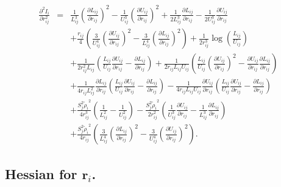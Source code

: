 \documentclass[12pt]{article}
\begin{document}
\begin{eqnarray}
\label{eq:BurialTerm2ndDerv2}
\frac{\partial^{2}I_{i}}{\partial r_{ij}^{2}} & = & 
\frac{1}{L_{ij}^{3}}\left(\frac{\partial L_{ij}}{\partial r_{ij}}\right)^{2} - \frac{1}{U_{ij}^{3}}\left(\frac{\partial U_{ij}}{\partial r_{ij}}\right)^{2}
+\frac{1}{2L_{ij}^{3}}\frac{\partial L_{ij}}{\partial r_{ij}} - \frac{1}{2U_{ij}^{3}}\frac{\partial U_{ij}}{\partial r_{ij}} \nonumber \\
&& + \frac{r_{ij}}{4}\left(\frac{3}{U_{ij}^{4}}\left(\frac{\partial U_{ij}}{\partial r_{ij}} \right)^{2}    - \frac{3}{L_{ij}^{4}}\left(\frac{\partial L_{ij}}{\partial r_{ij}} \right)^{2} \right) 
+ \frac{1}{2r_{ij}^{3}}\log\left(\frac{L_{ij}}{U_{ij}}\right) \nonumber \\
&& + \frac{1}{2r_{ij}^2L_{ij}}\left(  \frac{L_{ij}}{U_{ij}}\frac{\partial U_{ij}}{\partial r_{ij}} - \frac{\partial L_{ij}}{\partial r_{ij}} \right)
+ \frac{1}{2r_{ij}L_{ij}U_{ij}}\left(  \frac{L_{ij}}{U_{ij}}\left(\frac{\partial U_{ij}}{\partial r_{ij}}\right)^2-\frac{\partial U_{ij}}{\partial r_{ij}}  \frac{\partial L_{ij}}{\partial r_{ij}} \right) \nonumber \\
&& + \frac{1}{4r_{ij}L_{ij}^2}\frac{\partial L_{ij}}{\partial r_{ij}} \left(  \frac{L_{ij}}{U_{ij}}\frac{\partial U_{ij}}{\partial r_{ij}} - \frac{\partial L_{ij}}{\partial r_{ij}} \right)
- \frac{1}{4r_{ij}L_{ij}U_{ij}}\frac{\partial U_{ij}}{\partial r_{ij}} \left(  \frac{L_{ij}}{U_{ij}}\frac{\partial U_{ij}}{\partial r_{ij}} - \frac{\partial L_{ij}}{\partial r_{ij}} \right) \nonumber \\
&& + \frac{S_{j}^{2}{{\tilde{\rho}_{i}}}^{2}}{4r_{ij}^{3}}\left(\frac{1}{L_{ij}^2} - \frac{1}{U_{ij}^2} \right)
-\frac{S_{j}^{2}{{\tilde{\rho}_{i}}}^{2}}{2r_{ij}^{2}}\left( \frac{1}{U_{ij}^{3}}\frac{\partial U_{ij}}{\partial r_{ij}}
- \frac{1}{L_{ij}^{3}}\frac{\partial L_{ij}}{\partial r_{ij}}\right) \nonumber \\
&& + \frac{S_{j}^{2}{{\tilde{\rho}_{i}}}^{2}}{4r_{ij}}\left(\frac{3}{L_{ij}^{4}} \left(\frac{\partial L_{ij}}{\partial r_{ij}} \right)^{2} 
 - \frac{3}{U_{ij}^{4}} \left(\frac{\partial U_{ij}}{\partial r_{ij}} \right)^{2} \right).
\end{eqnarray}


\subsection*{Hessian for $\mathbf{r}_i$.}
\end{document}
